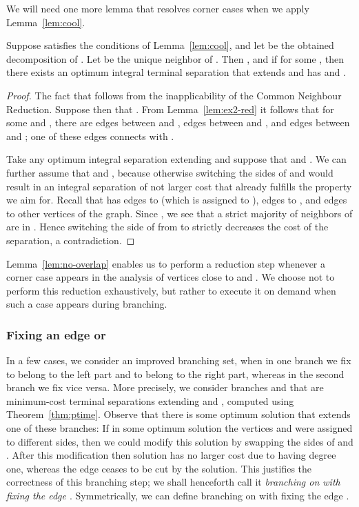 We will need one more lemma that resolves corner cases when we apply Lemma~\ref{lem:cool}.

\begin{lemma}\label{lem:no-overlap}
Suppose  satisfies the conditions of Lemma~\ref{lem:cool}, and let  be the obtained decomposition of . Let  be the unique neighbor of . Then , and if  for some , then there exists an optimum integral terminal separation  that extends  and has  and .
\end{lemma}
\begin{proof}
The fact that  follows from the inapplicability of the Common Neighbour Reduction. Suppose then that . From Lemma~\ref{lem:ex2-red} it follows that for some  and , there are  edges between  and ,  edges between  and , and  edges between  and ; one of these  edges connects  with .

Take any optimum integral separation  extending  and suppose that  and . We can further assume that  and , because otherwise switching the sides of  and  would result in an integral separation of not larger cost that already fulfills the property we aim for. Recall that  has  edges to  (which is assigned to ),  edges to , and  edges to other vertices of the graph. Since , we see that a strict majority of neighbors of  are in . Hence switching the side of  from  to  strictly decreases the cost of the separation, a contradiction.
\end{proof}

Lemma~\ref{lem:no-overlap} enables us to perform a reduction step whenever a corner case appears in the analysis of vertices close to  and . We choose not to perform this reduction exhaustively, but rather to execute it on demand when such a case appears during branching.



\subsubsection{Fixing an edge  or }

In a few cases, we consider an improved branching set,
when in one branch we fix  to belong to the left part and  to belong to the right part, whereas in the second branch we fix vice versa. More precisely, we consider branches  and  that are minimum-cost terminal separations extending  and , computed using Theorem~\ref{thm:ptime}. Observe that there is some optimum solution that extends one of these branches: If in some optimum solution the vertices  and  were assigned to different sides, then we could modify this solution by swapping the sides of  and . After this modification then solution has no larger cost due to  having degree one, whereas the edge  ceases to be cut by the solution. This justifies the correctness of this branching step; we shall henceforth call it {\em{branching on  with fixing the edge }}.
Symmetrically, we can define branching on  with fixing the edge .

